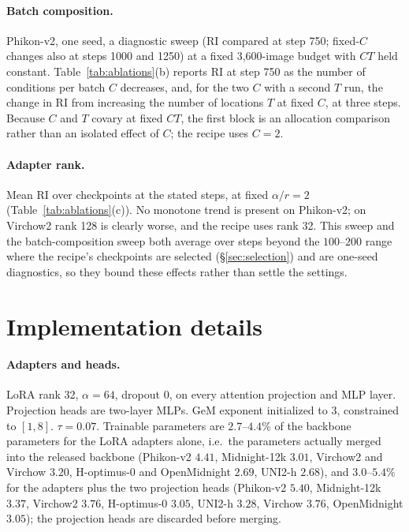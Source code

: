 \paragraph{Batch composition.}
Phikon-v2, one seed, a diagnostic sweep (RI compared at step 750; fixed-$C$ changes also at steps 1000 and 1250) at a fixed 3,600-image budget with $CT$ held
constant. Table~\ref{tab:ablations}(b) reports RI at step 750 as the number of conditions per
batch $C$ decreases, and, for the two $C$ with a second $T$ run, the change in RI from
increasing the number of locations $T$ at fixed $C$, at three steps. Because $C$ and $T$ covary
at fixed $CT$, the first block is an allocation comparison rather than an isolated effect of
$C$; the recipe uses $C=2$.

\paragraph{Adapter rank.}
Mean RI over checkpoints at the stated steps, at fixed $\alpha/r=2$
(Table~\ref{tab:ablations}(c)). No monotone trend is present on Phikon-v2; on Virchow2 rank 128
is clearly worse, and the recipe uses rank 32. This sweep and the batch-composition sweep both
average over steps beyond the $100$--$200$ range where the recipe's checkpoints are selected
(\S\ref{sec:selection}) and are one-seed diagnostics, so they bound these effects rather than
settle the settings.

\begin{table}[htbp]
\caption{Ablations, one seed each: (a) pseudo-tissue reweighting, (b) batch composition,
(c) adapter rank. Differences are read against the paper's
RI tolerance $\epsilon=0.007$ and, on HEST, against the tuned across-seed $2$\,SD of the same
backbone in the rightmost column of block (a); $^\dagger$ marks $|\Delta\mathrm{RI}|<\epsilon$,
and \textbf{bold} marks the recipe's setting.}
\label{tab:ablations}
\centering
\footnotesize
\setlength{\tabcolsep}{6pt}

\end{table}

\clearpage
\section{Implementation details}
\label{app:implementation}

\paragraph{Adapters and heads.}
LoRA rank 32, $\alpha=64$, dropout 0, on every attention projection and MLP layer. Projection
heads are two-layer MLPs. GeM exponent initialized to 3, constrained to $[1,8]$. $\tau=0.07$.
Trainable parameters are $2.7$--$4.4\%$ of the backbone parameters for the LoRA adapters
alone, i.e.\ the parameters actually merged into the released backbone (Phikon-v2 $4.41$,
Midnight-12k $3.01$, Virchow2 and Virchow $3.20$, H-optimus-0 and OpenMidnight $2.69$,
UNI2-h $2.68$), and $3.0$--$5.4\%$ for the adapters plus the two projection heads
(Phikon-v2 $5.40$, Midnight-12k $3.37$, Virchow2 $3.76$, H-optimus-0 $3.05$, UNI2-h $3.28$,
Virchow $3.76$, OpenMidnight $3.05$); the projection heads are discarded before merging.

